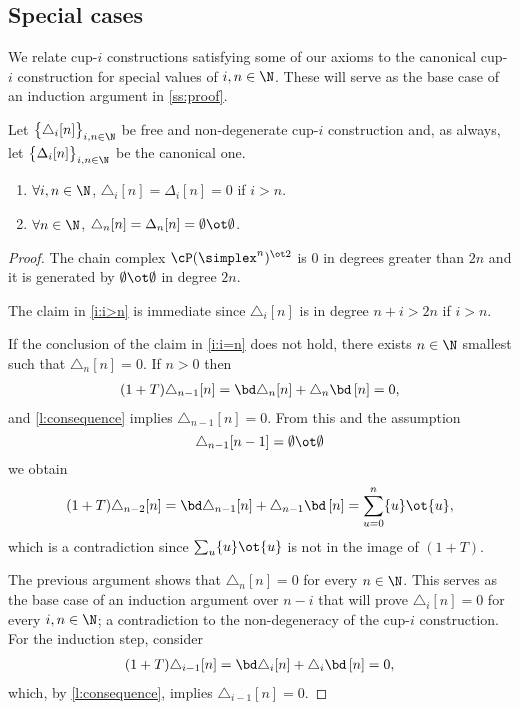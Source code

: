 \subsection{Special cases}\label{ss:cases}


We relate cup-$i$ constructions satisfying some of our axioms to the canonical cup-$i$ construction for special values of $i,n \in \N$.
These will serve as the base case of an induction argument in \cref{ss:proof}.

\begin{lemma}\label{l:special case one}
	Let $\big\{ \triangle_i [n] \big\}_{i,n\in\N}$ be free and non-degenerate \mbox{cup-$i$} construction and, as always, let $\big\{ \Delta_i [n] \big\}_{i,n\in\N}$ be the canonical one.
	\begin{enumerate}
		\item \label{i:i>n} $\forall i,n \in \N$, $\triangle_i[n] = \Delta_i [n] = 0$ if $i > n$.
		\item \label{i:i=n} $\forall n \in \N$, $\triangle_n[n] = \Delta_n [n] = \emptyset \ot \emptyset$.
	\end{enumerate}
\end{lemma}

\begin{proof}
	The chain complex $\cP(\simplex^n)^{\ot 2}$ is $0$ in degrees greater than $2n$ and it is generated by $\emptyset \ot \emptyset$ in degree $2n$.

	The claim in \cref{i:i>n} is immediate since $\triangle_i[n]$ is in degree $n+i > 2n$ if $i > n$.

	If the conclusion of the claim in \cref{i:i=n} does not hold, there exists $n \in \N$ smallest such that $\triangle_n [n] = 0$.
	If $n > 0$ then
	\begin{align*}
	(1+T) \triangle_{n-1} [n] =
	\bd \triangle_{n} [n] + \triangle_{n} \bd \, [n] = 0,
	\end{align*}
	and \cref{l:consequence} implies $\triangle_{n-1} [n] = 0$.
	From this and the assumption
	\[
	\triangle_{n-1}[n-1] = \emptyset \ot \emptyset
	\]
	we obtain
	\begin{equation}
	\begin{split}
	(1+T)\triangle_{n-2} [n] =
	\bd \triangle_{n-1} [n] + \triangle_{n-1} \bd \, [n] =
	\sum_{u = 0}^n \{u\} \ot \{u\},
	\end{split}
	\end{equation}
	which is a contradiction since $\sum_u \{u\} \ot \{u\}$ is not in the image of $(1+T)$.

	The previous argument shows that $\triangle_n [n] = 0$ for every $n \in \N$.
	This serves as the base case of an induction argument over $n-i$ that will prove $\triangle_i [n] = 0$ for every $i, n \in \N$; a contradiction to the non-degeneracy of the cup-$i$ construction.
	For the induction step, consider
	\begin{align*}
	(1+T) \triangle_{i-1} [n] =
	\bd \triangle_{i} [n] + \triangle_{i} \bd\, [n] = 0,
	\end{align*}
	which, by \cref{l:consequence}, implies $\triangle_{i-1} [n] = 0$.
\end{proof}

